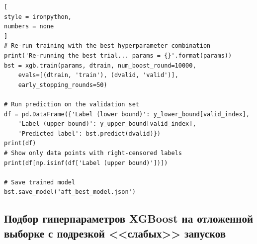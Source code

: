 \documentclass[%
	11pt,
	a4paper,
	utf8,
		]{article}
\begin{document}
\begin{lstlisting}[
style = ironpython,
numbers = none
]
# Re-run training with the best hyperparameter combination
print('Re-running the best trial... params = {}'.format(params))
bst = xgb.train(params, dtrain, num_boost_round=10000,
	evals=[(dtrain, 'train'), (dvalid, 'valid')],
	early_stopping_rounds=50)

# Run prediction on the validation set
df = pd.DataFrame({'Label (lower bound)': y_lower_bound[valid_index],
	'Label (upper bound)': y_upper_bound[valid_index],
	'Predicted label': bst.predict(dvalid)})
print(df)
# Show only data points with right-censored labels
print(df[np.isinf(df['Label (upper bound)'])])

# Save trained model
bst.save_model('aft_best_model.json')
\end{lstlisting}

\subsection{Подбор гиперпараметров XGBoost на отложенной выборке с подрезкой <<слабых>> запусков}
\end{document}
